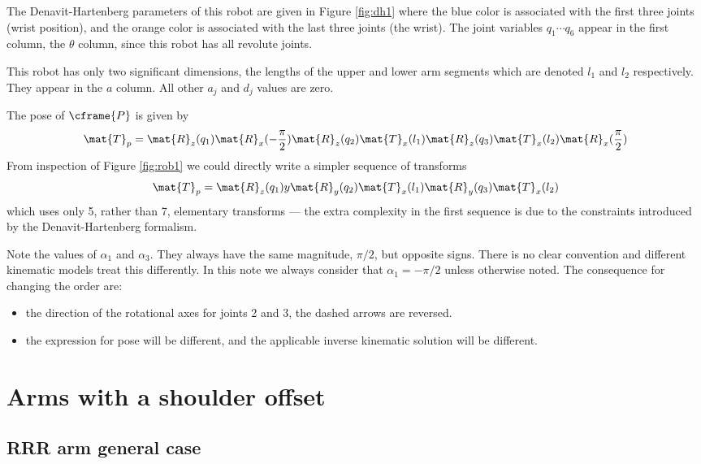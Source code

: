 \documentclass[11pt]{article}
\numberwithin{equation}{section}
\begin{document}
The Denavit-Hartenberg parameters of this robot are given in Figure \ref{fig:dh1} where the blue color is associated with the first three joints (wrist position), and the orange color is associated with the last three joints (the wrist).
The joint variables $q_1 \cdots q_6$ appear in the first column, the $\theta$ column, since this robot has all revolute joints.

This robot has only two significant dimensions, the lengths of the upper and lower arm segments which are denoted $l_1$ and $l_2$ respectively.  They appear in the $a$ column.  All other $a_j$ and $d_j$ values are zero.

The pose of $\cframe{P}$ is given by
\[
\mat{T}_p = \mat{R}_z(q_1) \mat{R}_x(-\frac{\pi}{2}) \mat{R}_z(q_2)  \mat{T}_x(l_1) \mat{R}_z(q_3) \mat{T}_x(l_2) \mat{R}_x(\frac{\pi}{2})
\]
From inspection of Figure \ref{fig:rob1} we could directly write\cite{Corke07a} a  simpler sequence of transforms
\[
\mat{T}_p = \mat{R}_z(q_1)y \mat{R}_y(q_2)  \mat{T}_x(l_1) \mat{R}_y(q_3) \mat{T}_x(l_2) \label{eq:rrr}
\]
which uses only 5, rather than 7, elementary transforms --- the extra complexity in the first sequence is due to the constraints introduced by the 
Denavit-Hartenberg formalism.

Note the values of $\alpha_1$ and $\alpha_3$.   They always have the same magnitude, $\pi/2$, but opposite signs.  There is no clear convention and
different kinematic models treat this differently.  In this note we always consider that $\alpha_1 = -\pi/2$ unless otherwise noted.
The consequence for changing the order are:
\begin{itemize}
\item  the direction of the rotational axes for joints 2 and 3, the dashed arrows are reversed.
\item the expression for pose  will be different, and the applicable inverse kinematic solution will be different.
\end{itemize}

\pagebreak
\section{Arms with a shoulder offset}
\subsection{RRR arm general case}
\end{document}
